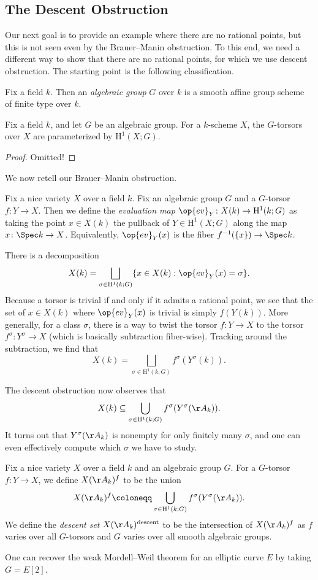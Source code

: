 \documentclass[../notes.tex]{subfiles}
\begin{document}
\subsection{The Descent Obstruction}
Our next goal is to provide an example where there are no rational points, but this is not seen even by the Brauer--Manin obstruction. To this end, we need a different way to show that there are no rational points, for which we use descent obstruction. The starting point is the following classification.
\begin{definition}
	Fix a field $k$. Then an \textit{algebraic group} $G$ over $k$ is a smooth affine group scheme of finite type over $k$.
\end{definition}
\begin{theorem}
	Fix a field $k$, and let $G$ be an algebraic group. For a $k$-scheme $X$, the $G$-torsors over $X$ are parameterized by $\mathrm H^1(X;G)$.
\end{theorem}
\begin{proof}
	Omitted!
\end{proof}
We now retell our Brauer--Manin obstruction.
\begin{definition}
	Fix a nice variety $X$ over a field $k$. Fix an algebraic group $G$ and a $G$-torsor $f\colon Y\to X$. Then we define the \textit{evaluation map} $\op{ev}_Y\colon X(k)\to\mathrm H^1(k;G)$ as taking the point $x\in X(k)$ the pullback of $Y\in\mathrm H^1(X;G)$ along the map $x\colon\Spec k\to X$. Equivalently, $\op{ev}_Y(x)$ is the fiber $f^{-1}(\{x\})\to\Spec k$.
\end{definition}
\begin{remark}
	There is a decomposition
	\[X(k)=\bigsqcup_{\sigma\in\mathrm H^1(k;G)}\{x\in X(k):\op{ev}_Y(x)=\sigma\}.\]
	Because a torsor is trivial if and only if it admits a rational point, we see that the set of $x\in X(k)$ where $\op{ev}_Y(x)$ is trivial is simply $f(Y(k))$. More generally, for a class $\sigma$, there is a way to twist the torsor $f\colon Y\to X$ to the torsor $f^\sigma\colon Y^\sigma\to X$ (which is basically subtraction fiber-wise). Tracking around the subtraction, we find that
	\[X(k)=\bigsqcup_{\sigma\in\mathrm H^1(k;G)}f^\sigma(Y^\sigma(k)).\]
\end{remark}
The descent obstruction now observes that
\[X(k)\subseteq\bigcup_{\sigma\in\mathrm H^1(k;G)}f^\sigma(Y^\sigma(\AA_k)).\]
It turns out that $Y^\sigma(\AA_k)$ is nonempty for only finitely many $\sigma$, and one can even effectively compute which $\sigma$ we have to study.
\begin{definition}
	Fix a nice variety $X$ over a field $k$ and an algebraic group $G$. For a $G$-torsor $f\colon Y\to X$, we define $X(\AA_k)^f$ to be the union
	\[X(\AA_k)^f\coloneqq\bigcup_{\sigma\in\mathrm H^1(k;G)}f^\sigma(Y^\sigma(\AA_k)).\]
	We define the \textit{descent set} $X(\AA_k)^{\mathrm{descent}}$ to be the intersection of $X(\AA_k)^f$ as $f$ varies over all $G$-torsors and $G$ varies over all smooth algebraic groups.
\end{definition}
\begin{remark}
	One can recover the weak Mordell--Weil theorem for an elliptic curve $E$ by taking $G=E[2]$.
\end{remark}
\end{document}
